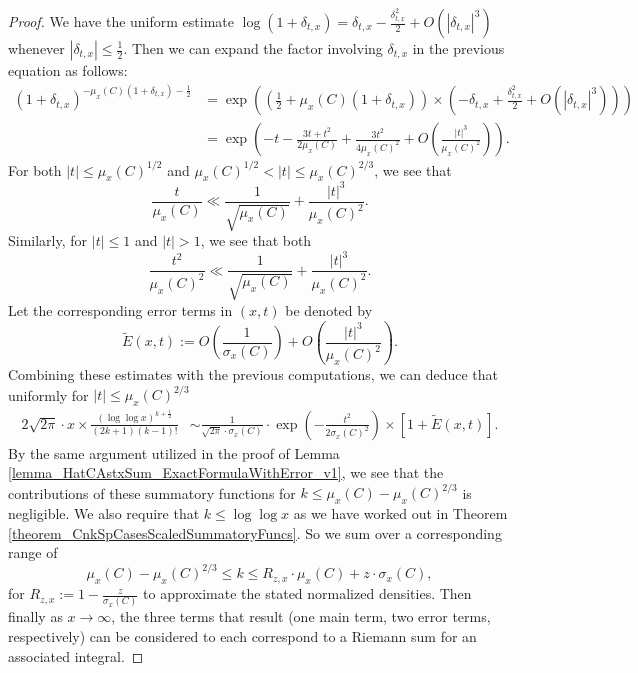 \documentclass[11pt,reqno,a4letter]{article}
\numberwithin{figure}{section}
\numberwithin{table}{section}
\theoremstyle{plain}
\numberwithin{theorem}{section}
\theoremstyle{definition}
\begin{document}
\begin{proof}
We have the uniform estimate 
$\log(1+\delta_{t,x}) = \delta_{t,x} - \frac{\delta_{t,x}^2}{2} + O(|\delta_{t,x}|^3)$ whenever 
$|\delta_{t,x}| \leq \frac{1}{2}$. Then we can expand the factor involving $\delta_{t,x}$ 
in the previous equation as follows: 
\begin{align*} 
(1+\delta_{t,x})^{-\mu_x(C) (1+\delta_{t,x}) - \frac{1}{2}} & = 
     \exp\left(\left(\frac{1}{2}+\mu_x(C) (1+\delta_{t,x})\right) \times 
     \left(-\delta_{t,x} + \frac{\delta_{t,x}^2}{2} + O(|\delta_{t,x}|^3)\right)\right) \\ 
     & = \exp\left(-t - \frac{3t+t^2}{2\mu_x(C)} + \frac{3t^2}{4\mu_x(C)^2} + 
     O\left(\frac{|t|^3}{\mu_x(C)^2}\right)\right). 
\end{align*} 
For both $|t| \leq \mu_x(C)^{1/2}$ and 
$\mu_x(C)^{1/2} < |t| \leq \mu_x(C)^{2/3}$, 
we see that 
\[
\frac{t}{\mu_x(C)} \ll \frac{1}{\sqrt{\mu_x(C)}} + \frac{|t|^3}{\mu_x(C)^2}. 
\]
Similarly, for $|t| \leq 1$ and $|t| > 1$, we see that both 
\[
\frac{t^2}{\mu_x(C)^2} \ll \frac{1}{\sqrt{\mu_x(C)}} + 
     \frac{|t|^3}{\mu_x(C)^2}. 
\] 
Let the corresponding error terms in $(x, t)$ be denoted by 
\[
\widetilde{E}(x, t) := O\left(\frac{1}{\sigma_x(C)}\right) + 
     O\left(\frac{|t|^3}{\mu_x(C)^2}\right). 
\]
Combining these estimates with the previous computations, we can deduce that 
uniformly for $|t| \leq \mu_x(C)^{2/3}$ 
\begin{align*} 
2\sqrt{2\pi} \cdot x \times 
     \frac{(\log\log x)^{k+\frac{1}{2}}}{(2k+1)(k-1)!} & \sim 
     \frac{1}{\sqrt{2\pi} \cdot \sigma_x(C)} 
     \cdot \exp\left(-\frac{t^2}{2\sigma_x(C)^2}\right) \times 
     \left[1 + \widetilde{E}(x, t)\right]. 
\end{align*} 
By the same argument utilized in the proof of 
Lemma \ref{lemma_HatCAstxSum_ExactFormulaWithError_v1}, we see that 
the contributions of these summatory functions for 
$k \leq \mu_x(C) - \mu_x(C)^{2/3}$ is negligible. 
We also require that $k \leq \log\log x$ as we have worked out in 
Theorem \ref{theorem_CnkSpCasesScaledSummatoryFuncs}. So we sum over a 
corresponding range of 
\[
\mu_x(C) -\mu_x(C)^{2/3} \leq k \leq R_{z,x} \cdot \mu_x(C) + z \cdot \sigma_x(C), 
\] 
for $R_{z,x} := 1 - \frac{z}{\sigma_x(C)}$ to approximate the 
stated normalized densities. 
Then finally as $x \rightarrow \infty$, the 
three terms that result (one main term, two error terms, respectively) 
can be considered to each correspond to a Riemann sum for an associated integral. 
\end{proof} 
\end{document}
